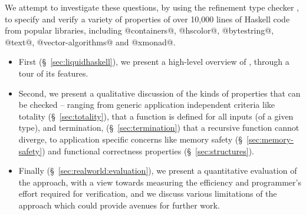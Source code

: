 We attempt to investigate these questions, by using the
refinement type checker \toolname, to specify and verify a variety of 
properties of over 10,000 lines of Haskell code from popular 
libraries, including @containers@, \hbox{@hscolor@,} @bytestring@, @text@, 
@vector-algorithms@ and @xmonad@. 
%
\begin{itemize}
\item First (\S~\ref{sec:liquidhaskell}), 
we present a high-level overview of \toolname, through a tour 
of its features.
%

\item Second, we present a qualitative discussion of the kinds of properties
that can be checked -- ranging from generic application independent 
criteria like totality (\S~\ref{sec:totality}), 
\ie that a function is defined for all inputs (of a given type),  
and termination, 
(\S~\ref{sec:termination}) 
\ie that a recursive function cannot diverge,
to application specific concerns like memory safety (\S~\ref{sec:memory-safety}) 
and functional correctness properties (\S~\ref{sec:structures}).
%
\item Finally (\S~\ref{sec:realworld:evaluation}), we present a quantitative evaluation of the approach, with a view
towards measuring the efficiency and programmer's effort required for
verification, 
and we discuss various limitations of the approach which could
provide avenues for further work.
\end{itemize}
